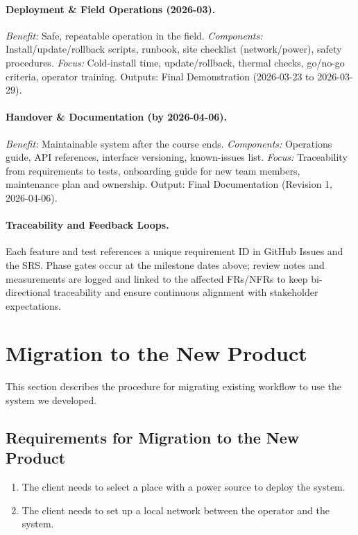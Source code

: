 \documentclass[12pt]{article}
\begin{document}
\paragraph{Deployment \& Field Operations (2026-03).}
\emph{Benefit:} Safe, repeatable operation in the field.
\emph{Components:} Install/update/rollback scripts, runbook, site checklist (network/power), safety procedures.
\emph{Focus:} Cold-install time, update/rollback, thermal checks, go/no-go criteria, operator training. Outputs: Final Demonstration (2026-03-23 to 2026-03-29).

\paragraph{Handover \& Documentation (by 2026-04-06).}
\emph{Benefit:} Maintainable system after the course ends.
\emph{Components:} Operations guide, API references, interface versioning, known-issues list.
\emph{Focus:} Traceability from requirements to tests, onboarding guide for new team members, maintenance plan and ownership. Output: Final Documentation (Revision 1, 2026-04-06).

\paragraph{Traceability and Feedback Loops.}
Each feature and test references a unique requirement ID in GitHub Issues and
the SRS. Phase gates occur at the milestone dates above; review notes and
measurements are logged and linked to the affected FRs/NFRs to keep
bi-directional traceability and ensure continuous alignment with stakeholder
expectations.


\section{Migration to the New Product}

This section describes the procedure for migrating existing workflow to use the
system we developed.

\subsection{Requirements for Migration to the New Product}

\begin{enumerate}
  \item The client needs to select a place with a power source to deploy the system.
  \item The client needs to set up a local network between the operator and the system.
\end{enumerate}
\end{document}
